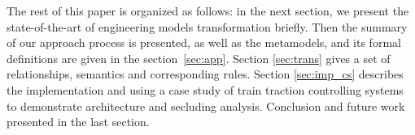 The rest of this paper is organized as follows: in the next section, we present the state-of-the-art of engineering models transformation briefly. Then the summary of our approach process is presented, as well as the metamodels, and its formal definitions are given in the section~\ref{sec:app}. Section \ref{sec:trans} gives a set of relationships, semantics and corresponding rules. Section \ref{sec:imp_cs} describes the implementation and using a case study of train traction controlling systems to demonstrate architecture and secluding analysis. Conclusion and future work presented in the last section.
